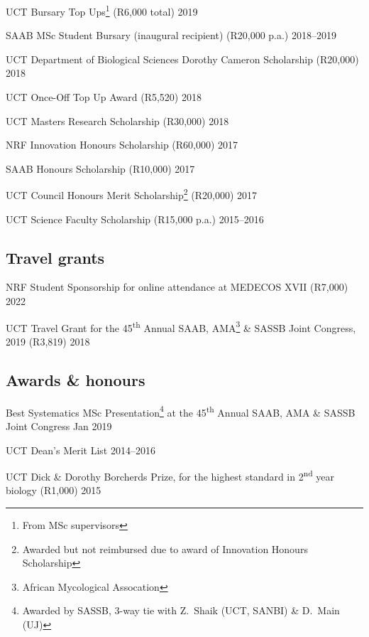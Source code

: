 \documentclass[10pt]{article}
\begin{document}
UCT Bursary Top Ups\footnote{From MSc supervisors} (R6,000 total)    \hfill 2019

SAAB MSc Student Bursary (inaugural recipient) (R20,000 p.a.)  \hfill 2018--2019

UCT Department of Biological Sciences Dorothy Cameron Scholarship
  (R20,000)                                                          \hfill 2018

UCT Once-Off Top Up Award (R5,520)                                   \hfill 2018

UCT Masters Research Scholarship (R30,000)                           \hfill 2018

NRF Innovation Honours Scholarship (R60,000)                         \hfill 2017

SAAB Honours Scholarship (R10,000)                                   \hfill 2017

UCT Council Honours Merit Scholarship\footnote{Awarded but not
  reimbursed due to award of Innovation Honours Scholarship}
  (R20,000)                                                          \hfill 2017

UCT Science Faculty Scholarship (R15,000 p.a.)                 \hfill 2015--2016

\subsection*{Travel grants}

NRF Student Sponsorship for online attendance at MEDECOS XVII
  (R7,000)                                                           \hfill 2022

UCT Travel Grant for the 45\textsuperscript{th} Annual SAAB,
  AMA\footnote{African Mycological Assocation} \& SASSB Joint
  Congress, 2019 (R3,819)                                            \hfill 2018

\subsection*{Awards \& honours}

Best Systematics MSc Presentation\footnote{Awarded by SASSB,
  3-way tie with Z.~Shaik (UCT, SANBI) \& D.~Main (UJ)}
  at the 45\textsuperscript{th}
  Annual SAAB, AMA \& SASSB Joint Congress                       \hfill Jan 2019

UCT Dean's Merit List                                          \hfill 2014--2016

UCT Dick \& Dorothy Borcherds Prize, for the highest standard in 
  2\textsuperscript{nd} year biology (R1,000)                        \hfill 2015
\end{document}
